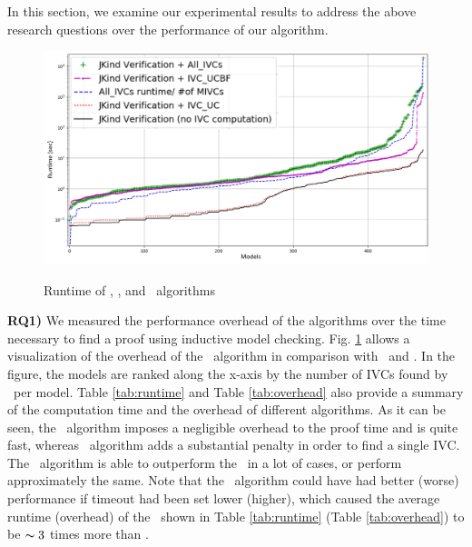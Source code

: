 In this section, we examine our experimental results to address the above research questions over the performance of our algorithm.

\begin{figure}[t]
 \centering
  \includegraphics[width=\textwidth]{figs/performance.jpg}
  \label{fig:performance}
  \vspace{-0.2in}
  \caption{Runtime of \aivcalg, \ucbfalg, and \ucalg ~algorithms}
\end{figure}
\vspace{0.1in}
\textbf{RQ1)} We measured the performance overhead of the algorithms over the time
necessary to find a proof using inductive model checking. Fig. \ref{fig:performance}
 allows a visualization of the  overhead  of the \aivcalg ~algorithm  in  comparison  with \ucalg ~and \ucbfalg.
 In the figure, the models are ranked along the x-axis by the number of IVCs found by \ucalg ~per model.
 Table \ref{tab:runtime} and Table \ref{tab:overhead} also provide a summary of the computation time and the overhead of different algorithms.
 As it can be seen, the \ucalg ~algorithm imposes a negligible overhead to the proof time and is quite fast, whereas \ucbfalg ~algorithm adds a substantial penalty in order to find a single IVC.
 The \aivcalg ~algorithm is able to outperform the \ucbfalg ~in a lot of cases,
 or perform approximately the same.
 Note that the \aivcalg ~algorithm could have had better (worse) performance
 if timeout had been set lower (higher), which caused the average runtime (overhead) of the \aivcalg ~shown in Table \ref{tab:runtime} (Table \ref{tab:overhead}) to be $\thicksim 3$ times more than \ucbfalg .



